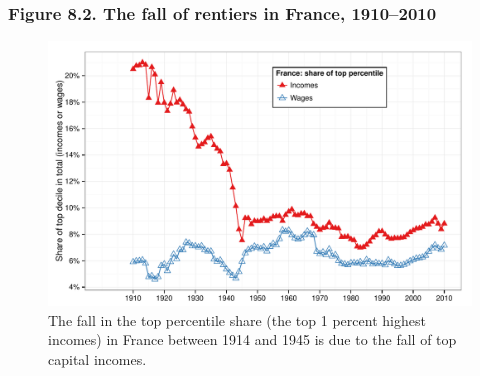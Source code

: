 \documentclass[t]{beamer}\usepackage[]{graphicx}\usepackage[]{color}
\newenvironment{knitrout}{}{} %
\begin{document}
\begin{frame}[label=Figure_8_2,fragile]
\frametitle{Figure 8.2. The fall of rentiers in France, 1910--2010}
\begin{figure}[t]
\begin{minipage}[b]{\textwidth}
\centering
\begin{knitrout}\footnotesize
{}\color{fgcolor}

{\centering \includegraphics[width=1\linewidth]{figures/color/Figure_8_2} 

}



\end{knitrout}
\caption{The fall in the top percentile share (the top 1 percent highest incomes) in France between 1914 and 1945 is due to the fall of top capital incomes.}
\end{minipage}
\end{figure}
\end{frame}
\end{document}

